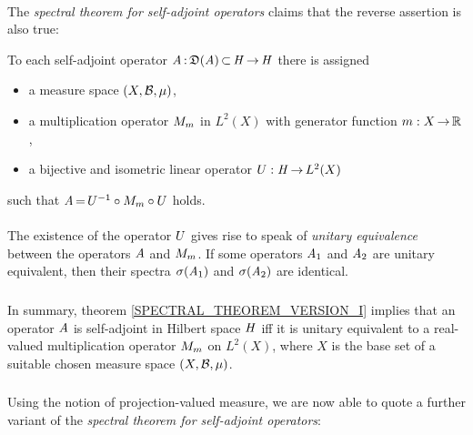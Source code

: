\documentclass[11pt,twoside]{article}
\begin{document}
\paragraph*{}
The \textit{spectral theorem for self-adjoint operators} claims
that the reverse assertion is also true:

\begin{theorem}\label{SPECTRAL_THEOREM_VERSION_I}
To each self-adjoint operator
$\mathit{A} {\,:\,} \mathfrak{D}(\mathit{A}) {\,\subset\,} \mathit{H} {\,\to\,} \mathit{H}$
there is assigned

\begin{itemize}[leftmargin=7mm]
\item[(1)]
a measure space $(X,{\mathcal{B}},\mu)$,

\item[(2)]
a multiplication operator
${M}_m$ in $L^2(X)$ with generator function $m:X {\,\to\,} {\mathbb{R}}$,

\item[(3)]
a bijective and isometric linear operator ${U}:\mathit{H} {\,\to\,} L^2(X)$
\end{itemize}

such that $\mathit{A} {\,=\,} {U}^{-1} \circ {M}_m \circ {U}$ holds.
\end{theorem}

\paragraph*{}
The existence of the operator ${U}$ gives rise to speak of
\textit{unitary equivalence} between the operators $\mathit{A}$ and ${M}_m$.
If some operators $\mathit{A}_1$ and $\mathit{A}_2$ are unitary equivalent,
then their spectra $\sigma(\mathit{A}_1)$ and $\sigma(\mathit{A}_2)$ are identical.

\subparagraph*{}
In summary, 
theorem \ref{SPECTRAL_THEOREM_VERSION_I} implies
that an operator $\mathit{A}$ is self-adjoint in Hilbert space $\mathit{H}$
iff
it is unitary equivalent to a real-valued multiplication operator ${M}_m$
on $L^2(X)$,
where $X$ is the base set of a suitable chosen measure space $(X,{\mathcal{B}},\mu)$.

\subsubsection*{} %
Using the notion of projection-valued measure,
we are now able to quote a further variant of
the \textit{spectral theorem for self-adjoint operators}:
\end{document}
